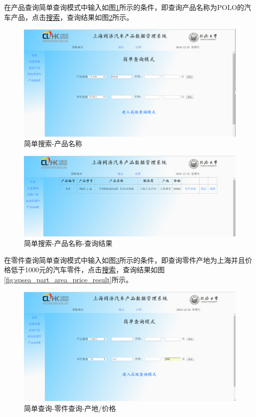 在产品查询简单查询模式中输入如图\ref{fig:spsearch_prd_name}所示的条件，即查询产品名称为POLO的汽车产品，点击\underline{搜索}，查询结果如图\ref{fig:spsearch_prd_name_result}所示。
\begin{figure}[H]
\centering
\includegraphics[width=0.9\linewidth]{figure/spsearch_prd_name}
\caption{简单搜索-产品名称}
\label{fig:spsearch_prd_name}
\end{figure}
\begin{figure}[H]
\centering
\includegraphics[width=0.9\linewidth]{figure/spsearch_prd_name_result}
\caption{简单搜索-产品名称-查询结果}
\label{fig:spsearch_prd_name_result}
\end{figure}

在零件查询简单查询模式中输入如图\ref{fig:spsea_part_area_price}所示的条件，即查询零件产地为上海并且价格低于1000元的汽车零件，点击\underline{搜索}，查询结果如图\ref{fig:spsea_part_area_price_result}所示。
\begin{figure}[H]
\centering
\includegraphics[width=0.9\linewidth]{figure/spsea_part_area_price}
\caption{简单查询-零件查询-产地/价格}
\label{fig:spsea_part_area_price}
\end{figure}

